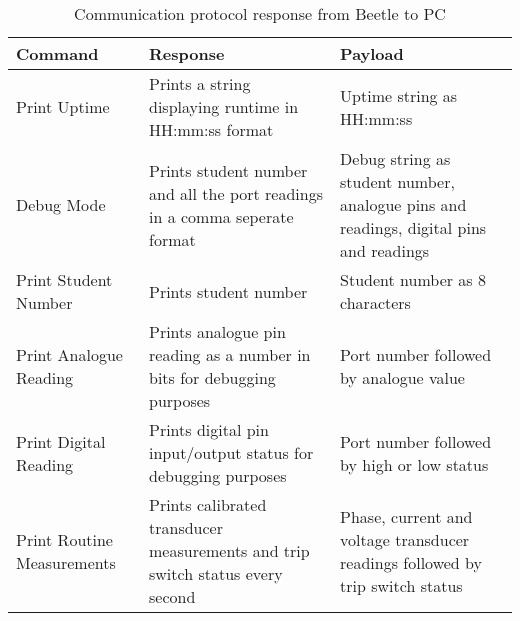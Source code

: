 \begin{table} [h!]
        \centering
        \footnotesize
        \caption{Communication protocol response from Beetle to PC}
         \begin{tabular}{C{4cm} C{5cm} C{6cm}}
           Command & Response & Payload\\
        \hline
            Print Uptime & Prints a string displaying runtime in HH:mm:ss format & Uptime string as HH:mm:ss \\
            Debug Mode & Prints student number and all the port readings in a comma seperate format  & Debug string as student number, analogue pins and readings, digital pins and readings\\
            Print Student Number & Prints student number & Student number as 8 characters \\
            Print Analogue Reading & Prints analogue pin reading as a number in bits for debugging purposes & Port number followed by analogue value \\
            Print Digital Reading & Prints digital pin input/output status for debugging purposes & Port number followed by high or low status \\
            Print Routine Measurements & Prints calibrated transducer measurements and trip switch status every second & Phase, current and voltage transducer readings followed by trip switch status\\
          \hline
        \end{tabular}
     \label{tab:commsprotocal2}
\end{table}